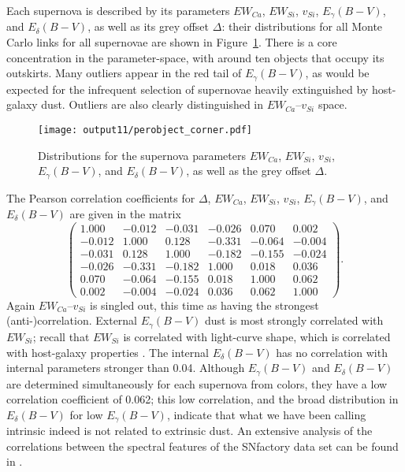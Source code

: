 \documentclass{aastex}   	%
\begin{document}
Each supernova is described by its parameters $EW_{Ca}$, $EW_{Si}$, $v_{Si}$, $E_\gamma(B-V)$, and $E_\delta(B-V)$, as well as its grey offset
$\Delta$: their distributions for all Monte Carlo links for all supernovae are shown in Figure~\ref{perobject:fig}.
There is a core concentration in the  parameter-space, with around ten objects that occupy its outskirts.
Many outliers appear in the red tail of $E_\gamma(B-V)$, as would be expected for the infrequent selection of supernovae
heavily extinguished by host-galaxy dust.
Outliers  are also clearly distinguished in  $EW_{Ca}$--$v_{Si}$ space.

\begin{figure}[htbp] %
   \centering
   \texttt{[image: output11/perobject\_corner.pdf]} 
   \caption{Distributions for the supernova parameters $EW_{Ca}$, $EW_{Si}$, $v_{Si}$, $E_\gamma(B-V)$, and $E_\delta(B-V)$, as well as the grey offset
$\Delta$.
   \label{perobject:fig}}
\end{figure}

The Pearson correlation coefficients for $\Delta$, $EW_{Ca}$, $EW_{Si}$, $v_{Si}$, $E_\gamma(B-V)$, and $E_\delta(B-V)$ are given in the matrix
\begin{equation}
\begin{pmatrix}
1.000 & -0.012 & -0.031 & -0.026 & 0.070 & 0.002 \\
-0.012 & 1.000 & 0.128 & -0.331 & -0.064 & -0.004 \\
-0.031 & 0.128 & 1.000 & -0.182 & -0.155 & -0.024 \\
-0.026 & -0.331 & -0.182 & 1.000 & 0.018 & 0.036 \\
0.070 & -0.064 & -0.155 & 0.018 & 1.000 & 0.062 \\
0.002 & -0.004 & -0.024 & 0.036 & 0.062 & 1.000
\end{pmatrix}.
\end{equation}
Again  $EW_{Ca}$--$v_{Si}$ is singled out, this time as having the strongest (anti-)correlation.  
External $E_\gamma(B-V)$ dust is
most strongly correlated with $EW_{Si}$; recall that $EW_{Si}$ is correlated with light-curve shape, which is correlated with host-galaxy properties
\citep{2003MNRAS.340.1057S}.
The internal $E_\delta(B-V)$  has no correlation  with internal parameters stronger than
0.04.  Although $E_\gamma(B-V)$ and $E_\delta(B-V)$ are determined simultaneously for each supernova from colors, they have a low correlation coefficient of 0.062;
this low correlation, and the broad distribution in $E_\delta(B-V)$ for low $E_\gamma(B-V)$,  indicate that what we have been calling intrinsic
indeed is not related to extrinsic dust.
An extensive analysis of the correlations between the spectral features of the SNfactory data set can be found in \citet{chotard:thesis}.
\end{document}

